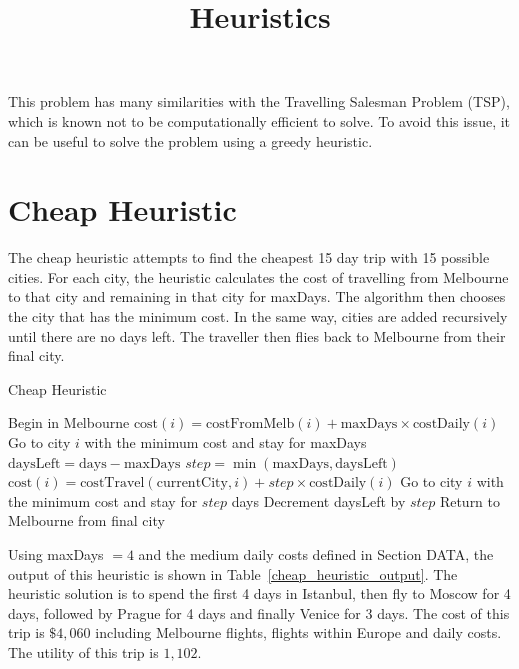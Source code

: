 \documentclass[12pt]{article}
\title{Heuristics}
\author{}
\date{}
\begin{document}
\maketitle

This problem has many similarities with the Travelling Salesman Problem (TSP), which is known not to be computationally efficient to solve. To avoid this issue, it can be useful to solve the problem using a greedy heuristic.

\section{Cheap Heuristic}

The cheap heuristic attempts to find the cheapest 15 day trip with 15 possible cities. For each city, the heuristic calculates the cost of travelling from Melbourne to that city and remaining in that city for maxDays. The algorithm then chooses the city that has the minimum cost. In the same way, cities are added recursively until there are no days left. The traveller then flies back to Melbourne from their final city.

\begin{algorithm}[ht!]
\caption{Cheap Heuristic}
\begin{algorithmic}
\STATE Begin in Melbourne
\STATE $\text{cost}(i) = \text{costFromMelb}(i) + \text{maxDays} \times \text{costDaily}(i)$
\ENDFOR
\STATE Go to city $i$ with the minimum cost and stay for maxDays
\STATE $\text{daysLeft} = \text{days} - \text{maxDays}$
\STATE $step = \min (\text{maxDays}, \text{daysLeft})$
\STATE $\text{cost}(i) = \text{costTravel}(\text{currentCity}, i) + step \times \text{costDaily}(i)$
\ENDFOR
\STATE Go to city $i$ with the minimum cost and stay for $step$ days
\STATE Decrement daysLeft by $step$
\ENDWHILE
\STATE Return to Melbourne from final city
\end{algorithmic}
\end{algorithm}

Using maxDays $= 4$ and the medium daily costs defined in Section DATA, the output of this heuristic is shown in Table~\ref{cheap_heuristic_output}. The heuristic solution is to spend the first 4 days in Istanbul, then fly to Moscow for 4 days, followed by Prague for 4 days and finally Venice for 3 days. The cost of this trip is $\$4,060$ including Melbourne flights, flights within Europe and daily costs. The utility of this trip is $1,102$.
\end{document}
